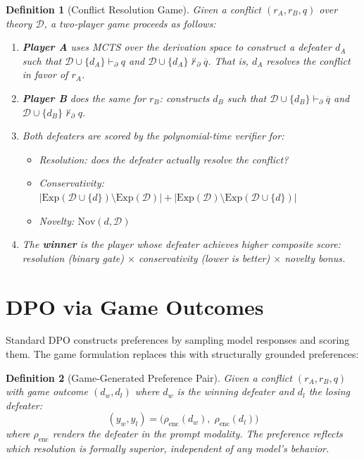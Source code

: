 \documentclass{article}
\newtheorem{definition}{Definition}
\newcommand{\D}{\mathcal{D}}
\newcommand{\Exp}{\mathrm{Exp}}
\newcommand{\Nov}{\mathrm{Nov}}
\newcommand{\pPartial}{\vdash_{\partial}}
\newcommand{\comp}[1]{\overline{#1}}
\begin{document}
\begin{definition}[Conflict Resolution Game]
Given a conflict $(r_A, r_B, q)$ over theory $\D$, a two-player game proceeds as follows:
\begin{enumerate}[nosep]
    \item \textbf{Player A} uses MCTS over the derivation space to construct a defeater $d_A$ such that $\D \cup \{d_A\} \pPartial q$ and $\D \cup \{d_A\} \not\pPartial \comp{q}$. That is, $d_A$ resolves the conflict in favor of $r_A$.
    \item \textbf{Player B} does the same for $r_B$: constructs $d_B$ such that $\D \cup \{d_B\} \pPartial \comp{q}$ and $\D \cup \{d_B\} \not\pPartial q$.
    \item Both defeaters are scored by the polynomial-time verifier for:
    \begin{itemize}[nosep]
        \item Resolution: does the defeater actually resolve the conflict?
        \item Conservativity: $|\Exp(\D \cup \{d\}) \setminus \Exp(\D)| + |\Exp(\D) \setminus \Exp(\D \cup \{d\})|$
        \item Novelty: $\Nov(d, \D)$
    \end{itemize}
    \item The \textbf{winner} is the player whose defeater achieves higher composite score: resolution (binary gate) $\times$ conservativity (lower is better) $\times$ novelty bonus.
\end{enumerate}
\end{definition}

\section{DPO via Game Outcomes}

Standard DPO constructs preferences by sampling model responses and scoring them. The game formulation replaces this with structurally grounded preferences:

\begin{definition}[Game-Generated Preference Pair]
Given a conflict $(r_A, r_B, q)$ with game outcome $(d_w, d_l)$ where $d_w$ is the winning defeater and $d_l$ the losing defeater:
\[
    (y_w, y_l) = \bigl(\rho_{\mathrm{enc}}(d_w),\; \rho_{\mathrm{enc}}(d_l)\bigr)
\]
where $\rho_{\mathrm{enc}}$ renders the defeater in the prompt modality. The preference reflects which resolution is formally superior, independent of any model's behavior.
\end{definition}
\end{document}
